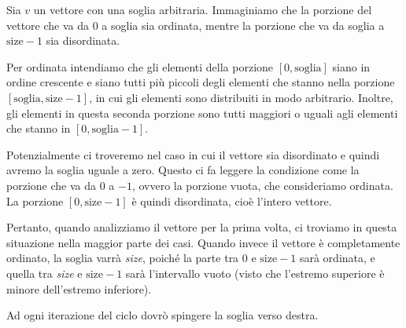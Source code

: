 Sia $v$ un vettore con una soglia arbitraria. Immaginiamo che la porzione del vettore che va da $0$ a soglia sia ordinata, mentre la porzione che va da soglia a $\text{size}-1$ sia disordinata.
\begin{center}
\end{center}

Per ordinata intendiamo che gli elementi della porzione $[0, \text{soglia}]$ siano in ordine crescente e siano tutti pi\`u piccoli degli elementi che stanno nella porzione $[\text{soglia}, \text{size}-1]$, in cui gli elementi sono distribuiti in modo arbitrario. Inoltre, gli elementi in questa seconda porzione sono tutti maggiori o uguali agli elementi che stanno in $[0, \text{soglia}-1]$.

Potenzialmente ci troveremo nel caso in cui il vettore sia disordinato e quindi avremo la soglia uguale a zero. Questo ci fa leggere la condizione come la porzione che va da $0$ a $-1$, ovvero la porzione vuota, che consideriamo ordinata. La porzione $[0,\text{size}-1]$ \`e quindi disordinata, cio\`e l'intero vettore.

Pertanto, quando analizziamo il vettore per la prima volta, ci troviamo in questa situazione nella maggior parte dei casi. Quando invece il vettore \`e completamente ordinato, la soglia varr\`a \textit{size}, poich\'e la parte tra $0$ e $\text{size}-1$ sar\`a ordinata, e quella tra \textit{size} e $\text{size}-1$ sar\`a l'intervallo vuoto (visto che l'estremo superiore \`e minore dell'estremo inferiore).

Ad ogni iterazione del ciclo dovr\`o spingere la soglia verso destra.

\begin{center}
\end{center}

